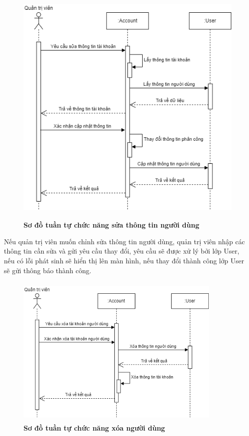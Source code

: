 \begin{figure}[H]
  \centering
  \includegraphics[width=12cm,height=12cm]{Images/sequence/sequence_manage_edit_user.png}
  \caption[Sơ đồ tuần tự chức năng sửa thông tin người dùng]{\bfseries \fontsize{12pt}{0pt}
  \selectfont Sơ đồ tuần tự chức năng sửa thông tin người dùng}
  \label{sequence_manage_edit_user} %
\end{figure}
Nếu quản trị viên muốn chỉnh sửa thông tin người dùng, quản trị viên nhập các thông tin cần sửa và gửi yêu cầu thay đổi, yêu cầu sẽ được xử lý bởi lớp User, nếu có lỗi phát sinh sẽ hiển thị lên màn hình,
nếu thay đổi thành công lớp User sẽ gửi thông báo thành công. 
\begin{figure}[H]
  \centering
  \includegraphics[width=10cm,height=7.5cm]{Images/sequence/sequence_manage_delete_user.png}
  \caption[Sơ đồ tuần tự chức năng xóa người dùng]{\bfseries \fontsize{12pt}{0pt}
  \selectfont Sơ đồ tuần tự chức năng xóa người dùng}
  \label{sequence_manage_delete_user} %
\end{figure}

